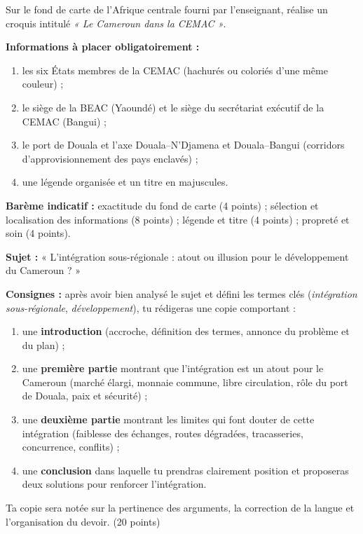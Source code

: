 \documentclass[11pt]{article}
\begin{document}
\begin{exercice}
Sur le fond de carte de l'Afrique centrale fourni par l'enseignant, réalise un croquis intitulé \emph{« Le Cameroun dans la CEMAC »}.

\textbf{Informations à placer obligatoirement :}
\begin{enumerate}
\item les six États membres de la CEMAC (hachurés ou coloriés d'une même couleur) ;
\item le siège de la BEAC (Yaoundé) et le siège du secrétariat exécutif de la CEMAC (Bangui) ;
\item le port de Douala et l'axe Douala--N'Djamena et Douala--Bangui (corridors d'approvisionnement des pays enclavés) ;
\item une légende organisée et un titre en majuscules.
\end{enumerate}

\textbf{Barème indicatif :} exactitude du fond de carte (4 points) ; sélection et localisation des informations (8 points) ; légende et titre (4 points) ; propreté et soin (4 points).
\end{exercice}

\begin{exercice}
\textbf{Sujet :} « L'intégration sous-régionale : atout ou illusion pour le développement du Cameroun ? »

\textbf{Consignes :} après avoir bien analysé le sujet et défini les termes clés (\emph{intégration sous-régionale}, \emph{développement}), tu rédigeras une copie comportant :
\begin{enumerate}
\item une \textbf{introduction} (accroche, définition des termes, annonce du problème et du plan) ;
\item une \textbf{première partie} montrant que l'intégration est un atout pour le Cameroun (marché élargi, monnaie commune, libre circulation, rôle du port de Douala, paix et sécurité) ;
\item une \textbf{deuxième partie} montrant les limites qui font douter de cette intégration (faiblesse des échanges, routes dégradées, tracasseries, concurrence, conflits) ;
\item une \textbf{conclusion} dans laquelle tu prendras clairement position et proposeras deux solutions pour renforcer l'intégration.
\end{enumerate}
Ta copie sera notée sur la pertinence des arguments, la correction de la langue et l'organisation du devoir. (20 points)
\end{exercice}
\end{document}
